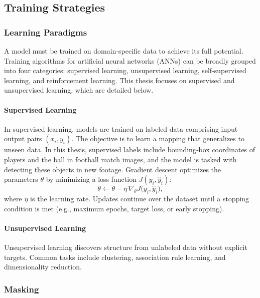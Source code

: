 \subsection{Training Strategies}
\label{ssec:training_stratergies}
\subsubsection{Learning Paradigms}
A model must be trained on domain‑specific data to achieve its full potential. Training algorithms for artificial neural networks (ANNs) can be broadly grouped into four categories: supervised learning, unsupervised learning, self‑supervised learning, and reinforcement learning. This thesis focuses on supervised and unsupervised learning, which are detailed below.

\paragraph{Supervised Learning}
In supervised learning, models are trained on labeled data comprising input–output pairs \((x_i, y_i)\). The objective is to learn a mapping that generalizes to unseen data. In this thesis, supervised labels include bounding‑box coordinates of players and the ball in football match images, and the model is tasked with detecting these objects in new footage. Gradient descent optimizes the parameters \(\theta\) by minimizing a loss function \(J(y_i, \hat y_i)\):  
\[
\theta \leftarrow \theta - \eta \,\nabla_{\theta}J\bigl(y_i,\hat y_i\bigr),
\]
where \(\eta\) is the learning rate. Updates continue over the dataset until a stopping condition is met (e.g., maximum epochs, target loss, or early stopping).

\paragraph{Unsupervised Learning}
Unsupervised learning discovers structure from unlabeled data without explicit targets. Common tasks include clustering, association rule learning, and dimensionality reduction. 

\subsubsection{Masking}

